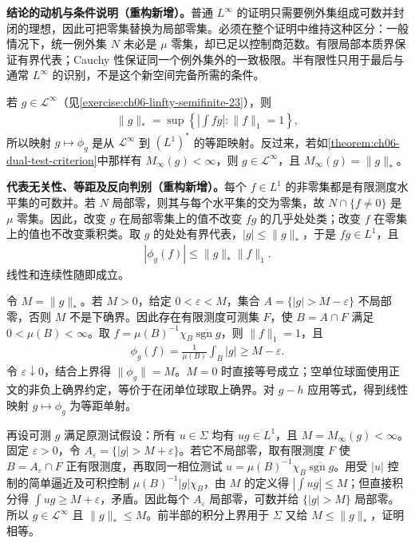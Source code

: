 \documentclass[../../main.tex]{subfiles}
\begin{document}
\begin{remark}
\textbf{结论的动机与条件说明（重构新增）。}普通 $L^\infty$ 的证明只需要例外集组成可数并封闭的理想，因此可把零集替换为局部零集。必须在整个证明中维持这种区分：一般情况下，统一例外集 $N$ 未必是 $\mu$ 零集，却已足以控制商范数。有限局部本质界保证有界代表；Cauchy 性保证同一个例外集外的一致极限。半有限性只用于最后与通常 $L^\infty$ 的识别，不是这个新空间完备所需的条件。
\end{remark}
\begin{exercise}\label{exercise:ch06-linfty-semifinite-24}
若 $g\in\mathcal L^\infty$（见\cref{exercise:ch06-linfty-semifinite-23}），则
\begin{align*}
\|g\|_* =\sup\left\{\left|\int fg\right|:\|f\|_1=1\right\},
\end{align*}
所以映射 $g\mapsto\phi_g$ 是从 $\mathcal L^\infty$ 到 $(L^1)^*$ 的等距映射。反过来，若如\cref{theorem:ch06-dual-test-criterion}中那样有 $M_\infty(g)<\infty$，则 $g\in\mathcal L^\infty$，且 $M_\infty(g)=\|g\|_*$。
\end{exercise}
\begin{solution}
\textbf{代表无关性、等距及反向判别（重构新增）。}每个 $f\in L^1$ 的非零集都是有限测度水平集的可数并。若 $N$ 局部零，则其与每个水平集的交为零集，故 $N\cap\{f\ne0\}$ 是 $\mu$ 零集。因此，改变 $g$ 在局部零集上的值不改变 $fg$ 的几乎处处类；改变 $f$ 在零集上的值也不改变乘积类。取 $g$ 的处处有界代表，$|g|\leqslant\|g\|_*$，于是 $fg\in L^1$，且
\begin{align*}
|\phi_g(f)|\leqslant\|g\|_*\|f\|_1.
\end{align*}
线性和连续性随即成立。

令 $M=\|g\|_*$。若 $M>0$，给定 $0<\varepsilon<M$，集合 $A=\{|g|>M-\varepsilon\}$ 不局部零，否则 $M$ 不是下确界。因此存在有限测度可测集 $F$，使 $B=A\cap F$ 满足 $0<\mu(B)<\infty$。取 $f=\mu(B)^{-1}\chi_B\overline{\operatorname{sgn}g}$，则 $\|f\|_1=1$，且
\begin{align*}
\phi_g(f)=\frac1{\mu(B)}\int_B|g|\geqslant M-\varepsilon.
\end{align*}
令 $\varepsilon\downarrow0$，结合上界得 $\|\phi_g\|=M$。$M=0$ 时直接等号成立；空单位球面使用正文的非负上确界约定，等价于在闭单位球取上确界。对 $g-h$ 应用等式，得到线性映射 $g\mapsto\phi_g$ 为等距单射。

再设可测 $g$ 满足原测试假设：所有 $u\in\Sigma$ 均有 $ug\in L^1$，且 $M=M_\infty(g)<\infty$。固定 $\varepsilon>0$，令 $A_\varepsilon=\{|g|>M+\varepsilon\}$。若它不局部零，取有限测度 $F$ 使 $B=A_\varepsilon\cap F$ 正有限测度，再取同一相位测试 $u=\mu(B)^{-1}\chi_B\overline{\operatorname{sgn}g}$。用受 $|u|$ 控制的简单逼近及可积控制 $\mu(B)^{-1}|g|\chi_B$，由 $M$ 的定义得 $|\int ug|\leqslant M$；但直接积分得 $\int ug\geqslant M+\varepsilon$，矛盾。因此每个 $A_\varepsilon$ 局部零，可数并给 $\{|g|>M\}$ 局部零。所以 $g\in\mathcal L^\infty$ 且 $\|g\|_*\leqslant M$。前半部的积分上界用于 $\Sigma$ 又给 $M\leqslant\|g\|_*$，证明相等。
\end{solution}
\end{document}
